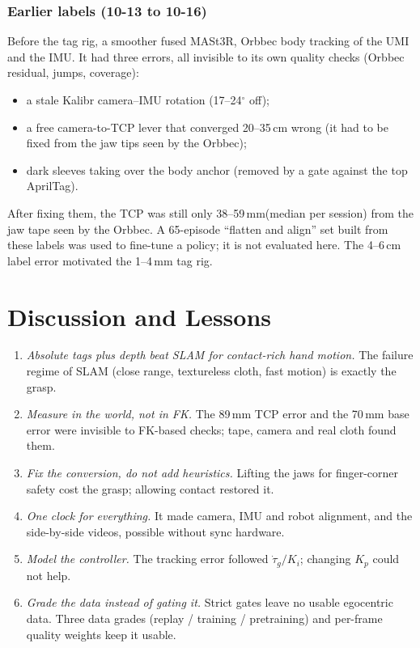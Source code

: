 \documentclass[conference,10pt]{IEEEtran}
\newcommand{\mm}{\,mm\xspace}
\begin{document}
\subsubsection{Earlier labels (10-13 to 10-16)}
Before the tag rig, a smoother fused MASt3R, Orbbec body tracking of the UMI and the IMU. It had three errors, all
invisible to its own quality checks (Orbbec residual, jumps, coverage):
\begin{itemize}
\item a stale Kalibr camera--IMU rotation (17--24$^\circ$ off);
\item a free camera-to-TCP lever that converged 20--35\,cm wrong (it had to be fixed from the jaw tips seen by the Orbbec);
\item dark sleeves taking over the body anchor (removed by a gate against the top AprilTag).
\end{itemize}
After fixing them, the TCP was still only 38--59\mm (median per session) from the jaw tape seen by the Orbbec. A 65-episode
``flatten and align'' set built from these labels was used to fine-tune a policy; it is not evaluated here. The 4--6\,cm
label error motivated the 1--4\mm tag rig.

\section{Discussion and Lessons}\label{sec:lessons}
\begin{enumerate}
\item \emph{Absolute tags plus depth beat SLAM for contact-rich hand motion.} The failure regime of SLAM (close range,
  textureless cloth, fast motion) is exactly the grasp.
\item \emph{Measure in the world, not in FK.} The 89\mm TCP error and the 70\mm base error were invisible to FK-based
  checks; tape, camera and real cloth found them.
\item \emph{Fix the conversion, do not add heuristics.} Lifting the jaws for finger-corner safety cost the grasp; allowing
  contact restored it.
\item \emph{One clock for everything.} It made camera, IMU and robot alignment, and the side-by-side videos, possible
  without sync hardware.
\item \emph{Model the controller.} The tracking error followed $\dot\tau_g/K_i$; changing $K_p$ could not help.
\item \emph{Grade the data instead of gating it.} Strict gates leave no usable egocentric data. Three data grades (replay /
  training / pretraining) and per-frame quality weights keep it usable.
\end{enumerate}
\end{document}
